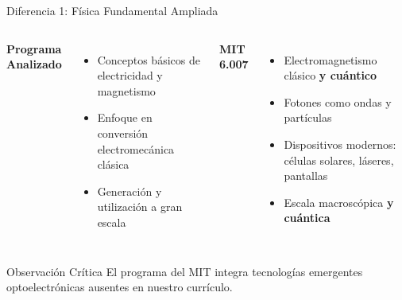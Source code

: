 \documentclass[aspectratio=43]{beamer}
\begin{document}
  \begin{frame}{Diferencia 1: Física Fundamental Ampliada}
  \begin{columns}
  \textbf{Programa Analizado}
  \begin{itemize}
  \item Conceptos básicos de electricidad y magnetismo
  \item Enfoque en conversión electromecánica clásica
  \item Generación y utilización a gran escala
  \end{itemize}
  
  \textbf{MIT 6.007}
  \begin{itemize}
  \item Electromagnetismo clásico \textbf{y cuántico}
  \item Fotones como ondas y partículas
  \item Dispositivos modernos: células solares, láseres, pantallas
  \item Escala macroscópica \textbf{y cuántica}
  \end{itemize}
  \end{columns}
  
  \vspace{0.5cm}
  
  \begin{alertblock}{Observación Crítica}
  El programa del MIT integra tecnologías emergentes optoelectrónicas ausentes en nuestro currículo.
  \end{alertblock}
  
  \end{frame}
  
\end{document}
